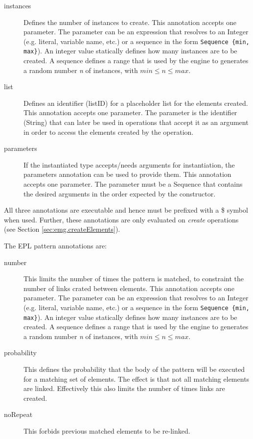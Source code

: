 \begin{description}
    \item[instances] Defines the number of instances to create. This annotation accepts one parameter. The parameter can be an expression that resolves to an Integer (e.g. literal, variable name, etc.)  or a sequence in the form \texttt{Sequence \{min, max\}}). An integer value statically defines how many instances are to be created. A sequence defines a range that is used by the engine to generates a random number \emph{n} of instances, with $min \le n \le max$.
    \item[list] Defines an identifier (listID) for a placeholder list for the elements created. This annotation accepts one parameter. The parameter is the identifier (String) that can later be used in operations that accept it as an argument in order to access the elements created by the operation. 
    \item[parameters] If the instantiated type accepts/needs arguments for instantiation, the parameters annotation can be used to provide them. This annotation accepts one parameter. The parameter must be a Sequence that contains the desired arguments in the order expected by the constructor. 
\end{description}

All three annotations are executable and hence must be prefixed with a \$ symbol when used. Further, these annotations are only evaluated on \emph{create} operations (see Section \ref{sec:emg.createElements}). 

The EPL pattern annotations are:

\begin{description}
    \item[number] This limits the number of times the pattern is matched, to constraint the number of links crated between elements. This annotation accepts one parameter. The parameter can be an expression that resolves to an Integer (e.g. literal, variable name, etc.)  or a sequence in the form \texttt{Sequence \{min, max\}}). An integer value statically defines how many instances are to be created. A sequence defines a range that is used by the engine to generates a random number \emph{n} of instances, with $min \le n \le max$.
    \item[probability] This defines the probability that the body of the pattern will be executed for a matching set of elements. The effect is that not all matching elements are linked. Effectively this also limits the number of times links are created.  
    \item[noRepeat] This forbids previous matched elements to be re-linked. 
\end{description}

